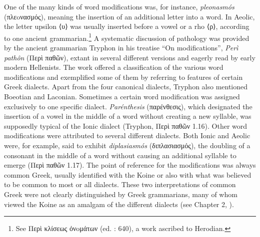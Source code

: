 One of the many kinds of word modifications was, for instance, \textit{pleonasmós} (πλεoνασμός), meaning the insertion of an additional letter into a word. In Aeolic, the letter upsilon ⟨υ⟩ was usually inserted before a vowel or a rho ⟨ρ⟩, according to one ancient grammarian.\footnote{{See Περὶ κλίσεως ὀνoμάτων (ed. \citealt{Lentz1870}: 640), a work ascribed to Herodian.}} A systematic discussion of pathology was provided by the ancient grammarian Tryphon in his treatise “On modifications”, \textit{Perì pathôn} (Περὶ παθῶν), extant in several different versions and eagerly read by early modern Hellenists. The work offered a classification of the various word modifications and exemplified some of them by referring to features of certain Greek dialects. Apart from the four canonical dialects, Tryphon also mentioned Boeotian and Laconian. Sometimes a certain word modification was assigned exclusively to one specific dialect. \textit{Parénthesis} (παρένθεσις), which designated the insertion of a vowel in the middle of a word without creating a new syllable, was supposedly typical of the Ionic dialect (Tryphon, Περὶ παθῶν 1.16). Other word modifications were attributed to several different dialects. Both Ionic and Aeolic were, for example, said to exhibit \textit{diplasiasmós} (διπλασιασμός), the doubling of a consonant in the middle of a word without causing an additional syllable to emerge (Περὶ παθῶν 1.17). The point of reference for the modifications was always common Greek, usually identified with the Koine or also with what was believed to be common to most or all dialects. These two interpretations of common Greek were not clearly distinguished by Greek grammarians, many of whom viewed the Koine as an amalgam of the different dialects (see Chapter 2, ).



